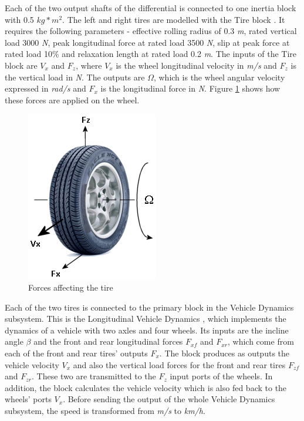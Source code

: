 Each of the two output shafts of the differential is connected to one inertia block with 0.5 $kg*m^2$. The left and right tires are modelled with the Tire block \citep{tireMatlab}. It requires the following parameters - effective rolling radius of 0.3 \textit{m}, rated vertical load 3000 \textit{N}, peak longitudinal force at rated load 3500 \textit{N}, slip at peak force at rated load 10\% and relaxation length at rated load 0.2 \textit{m}. The inputs of the Tire block are $V_x$ and $F_z$, where $V_x$ is the wheel longitudinal velocity in \textit{m/s} and $F_z$ is the vertical load in \textit{N}. The outputs are $\Omega$, which is the wheel angular velocity expressed in \textit{rad/s} and $F_x$ is the longitudinal force in \textit{N}. Figure \ref{fig:tire} shows how these forces are applied on the wheel.

\begin{figure}[h]
\centering
\includegraphics[scale=0.8]{figures/tire}
\caption{Forces affecting the tire \citep{tireMatlab}}
\label{fig:tire}
\end{figure}

Each of the two tires is connected to the primary block in the Vehicle Dynamics subsystem. This is the Longitudinal Vehicle Dynamics \citep{vehicleDynMatlab}, which implements the dynamics of a vehicle with two axles and four wheels. Its inputs are the incline angle $\beta$ and the front and rear longitudinal forces $F_{xf}$ and $F_{xr}$, which come from each of the front and rear tires' outputs $F_x$. The block produces as outputs the vehicle velocity $V_x$ and also the vertical load forces for the front and rear tires $F_{zf}$ and $F_{zr}$. These two are transmitted to the $F_z$ input ports of the wheels. In addition, the block calculates the vehicle velocity which is also fed back to the wheels' ports $V_x$. Before sending the output of the whole Vehicle Dynamics subsystem, the speed is transformed from \textit{m/s} to \textit{km/h}.

